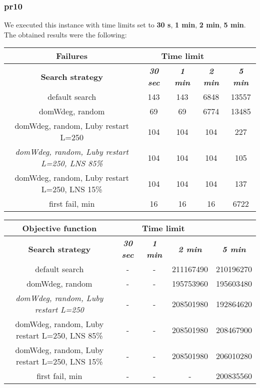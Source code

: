 \subsubsection{pr10}
We executed this instance with time limits set to \textbf{30 s}, \textbf{1 min}, \textbf{2 min}, \textbf{5 min}.\\
The obtained results were the following:
{
\renewcommand{\arraystretch}{2}
\begin{longtable}[h]{| c | c | c | c | c |}
    \hline
    \textbf{Failures} & \multicolumn{3}{c}{Time limit} & \\
    \hline
    \textbf{Search strategy} & \textbf{\textit{30 sec}} & \textbf{\textit{1 min}} & \textbf{\textit{2 min}} & \textbf{\textit{5 min}} \\
    \hline
    \endhead
    default search                                         & 143 &  143 &  6848 & 13557 \\
    \hline
    domWdeg, random                                        &  69 &   69 &  6774 & 13485 \\
    \hline
    domWdeg, random, Luby restart L=250                    & 104 &  104 &  104 &    227 \\
    \hline
    \textit{domWdeg, random, Luby restart L=250, LNS 85\%} & 104 &  104 &  104 &    105 \\
    \hline
    domWdeg, random, Luby restart L=250, LNS 15\%          & 104 &  104 &  104 &    137 \\
    \hline
    first fail, min                                        &  16 &   16 &   16 &   6722 \\
    \hline
\end{longtable}
}

{
\renewcommand{\arraystretch}{2}
\begin{longtable}[h]{| c | c | c | c | c |}
    \hline
    \textbf{Objective function} & \multicolumn{3}{c}{Time limit} & \\
    \hline
    \textbf{Search strategy} & \textbf{\textit{30 sec}} & \textbf{\textit{1 min}} & \textbf{\textit{2 min}} & \textbf{\textit{5 min}} \\
    \hline
    \endhead
    default search                                & - & - & 211167490 & 210196270 \\
    \hline
    domWdeg, random                               & - & - & 195753960 & 195603480 \\
    \hline
    \textit{domWdeg, random, Luby restart L=250}  & - & - & 208501980 & 192864620 \\
    \hline
    domWdeg, random, Luby restart L=250, LNS 85\% & - & - & 208501980 & 208467900 \\
    \hline
    domWdeg, random, Luby restart L=250, LNS 15\% & - & - & 208501980 & 206010280 \\
    \hline
    first fail, min                               & - & - &         - & 200835560 \\
    \hline
\end{longtable}
}